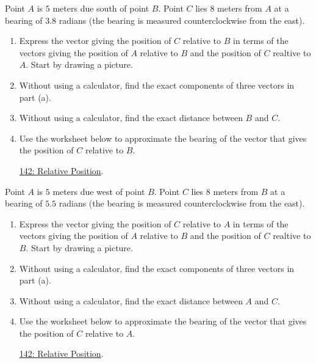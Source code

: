 \documentclass{ximera}
\begin{document}
\begin{question}  \label{Q9dfrwDSFD}
Point $A$ is $5$ meters due south of point $B$. Point $C$ lies $8$ meters from $A$ at a bearing of $3.8$ radians (the bearing is measured counterclockwise from the east).

\begin{enumerate}
\item Express the vector giving the position of $C$ relative to $B$ in terms of the vectors giving the position of $A$ relative to $B$ and the position of $C$ realtive to $A$. Start by drawing a picture.

\item Without using a calculator, find the exact components of three vectors in part (a).

\item Without using a calculator, find the exact distance between $B$ and $C$.

\item Use the worksheet below to approximate the bearing  of the vector that gives the position of $C$ relative to $B$.

\href{https://www.geogebra.org/classic/bhdsgxtx}{142: Relative Position}.

 
\begin{onlineOnly}
    \begin{center}
\end{center}
\end{onlineOnly}
\end{enumerate}
\end{question}

\begin{question}  \label{Q9dferevdeewDSFD}
Point $A$ is $5$ meters due west of point $B$. Point $C$ lies $8$ meters from $B$ at a bearing of $5.5$ radians (the bearing is measured counterclockwise from the east).

\begin{enumerate}
\item Express the vector giving the position of $C$ relative to $A$ in terms of the vectors giving the position of $A$ relative to $B$ and the position of $C$ realtive to $B$. Start by drawing a picture.

\item Without using a calculator, find the exact components of three vectors in part (a).

\item Without using a calculator, find the exact distance between $A$ and $C$.

\item Use the worksheet below to approximate the bearing of the vector that gives the position of $C$ relative to $A$.

\href{https://www.geogebra.org/classic/bhdsgxtx}{142: Relative Position}.

 
\begin{onlineOnly}
    \begin{center}
\end{center}
\end{onlineOnly}
\end{enumerate}
\end{question}
\end{document}
